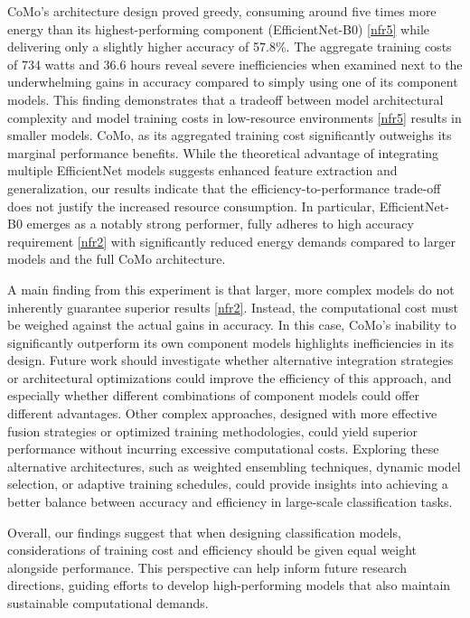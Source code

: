 CoMo’s architecture design proved greedy, consuming around five times more energy than its highest-performing component (EfficientNet-B0) \ref{nfr5} while delivering only a slightly higher accuracy of 57.8\%. The aggregate training costs of 734 watts and 36.6 hours reveal severe inefficiencies when examined next to the underwhelming gains in accuracy compared to simply using one of its component models. This finding demonstrates that a tradeoff between model architectural complexity and model training costs in low-resource environments \ref{nfr5} results in smaller models. CoMo, as its aggregated training cost significantly outweighs its marginal performance benefits. While the theoretical advantage of integrating multiple EfficientNet models suggests enhanced feature extraction and generalization, our results indicate that the efficiency-to-performance trade-off does not justify the increased resource consumption. In particular, EfficientNet-B0 emerges as a notably strong performer, fully adheres to high accuracy requirement \ref{nfr2} with significantly reduced energy demands compared to larger models and the full CoMo architecture.

A main finding from this experiment is that larger, more complex models do not inherently guarantee superior results \ref{nfr2}. Instead, the computational cost must be weighed against the actual gains in accuracy. In this case, CoMo’s inability to significantly outperform its own component models highlights inefficiencies in its design. Future work should investigate whether alternative integration strategies or architectural optimizations could improve the efficiency of this approach, and especially whether different combinations of component models could offer different advantages.
Other complex approaches, designed with more effective fusion strategies or optimized training methodologies, could yield superior performance without incurring excessive computational costs. Exploring these alternative architectures, such as weighted ensembling techniques, dynamic model selection, or adaptive training schedules, could provide insights into achieving a better balance between accuracy and efficiency in large-scale classification tasks.

Overall, our findings suggest that when designing classification models, considerations of training cost and efficiency should be given equal weight alongside performance. This perspective can help inform future research directions, guiding efforts to develop high-performing models that also maintain sustainable computational demands.





